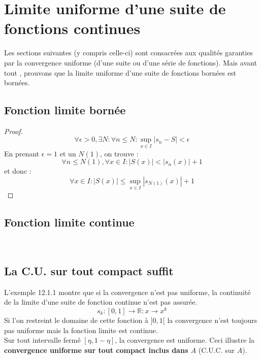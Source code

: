\documentclass[11pt, a4paper, openany]{book}
\begin{document}
							
							
							
							
							
							
		\section{Limite uniforme d'une suite de fonctions continues}
		Les sections suivantes (y compris celle-ci) sont consacrées aux qualités garanties par la convergence uniforme (d'une suite ou d'une série de fonctions). Mais avant tout , prouvons que la limite uniforme d'une suite de fonctions bornées est bornées.  
		\setcounter{subsection}{-1}
		\subsection{Fonction limite bornée}
		\begin{proof}
			\begin{equation}
				\forall \epsilon > 0, \exists N : \forall n \leq N : \sup\limits_{x \in I} |s_n - S| < \epsilon
			\end{equation}
			En prenant $\epsilon = 1$ et un $N(1)$, on trouve :
			\begin{equation}
				\forall n \leq N(1), \forall x \in I : |S(x)| < |s_n(x)|+1
			\end{equation}
			et donc :
			\begin{equation}
				\forall x \in I : |S(x)| \leq \sup\limits_{x \in I} |s_{N(1)}(x)|+1
			\end{equation}
		\end{proof}
							
							
							
		\subsection{Fonction limite continue}
		\ \\
							
		\subsection{La C.U. sur tout compact suffit}
		L'exemple 12.1.1 montre que si la convergence n'est pas uniforme, la continuité de la limite d'une suite de fonction continue n'est pas assurée. 
		\begin{equation}
			s_k : [0,1] \rightarrow \mathbb{R} : x \rightarrow x^k
		\end{equation}
		Si l'on restreint le domaine de cette fonction à $]0,1[$ la convergence n'est toujours pas uniforme mais la fonction limite est continue.\\
		Sur tout intervalle fermé $[\eta, 1-\eta]$, la convergence est uniforme. Ceci illustre la \textbf{convergence uniforme sur tout compact inclus dans $A$} (C.U.C. sur $A$).
							
\end{document}
